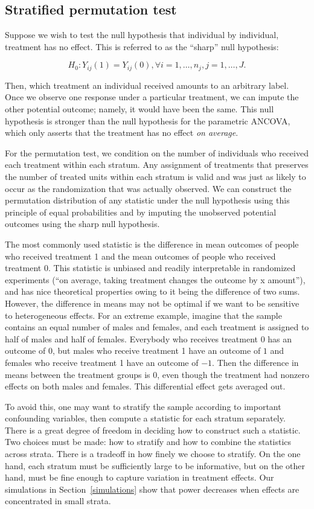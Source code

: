 \documentclass[12pt]{article}
\begin{document}
\subsection{Stratified permutation test}\label{subsec:strat_perm_test}
Suppose we wish to test the null hypothesis that individual by individual, treatment has no effect.
This is referred to as the ``sharp'' null hypothesis:

$$H_0: Y_{ij}(1) = Y_{ij}(0), \forall i = 1, \dots, n_j, j = 1,\dots, J.$$

Then, which treatment an individual received amounts to an arbitrary label.
Once we observe one response under a particular treatment, we can impute the other potential outcome; namely, it would have been the same.
This null hypothesis is stronger than the null hypothesis for the parametric ANCOVA, which only asserts that the treatment has no effect \textit{on average}.

For the permutation test, we condition on the number of individuals who received each treatment within each stratum.
Any assignment of treatments that preserves the number of treated units within each stratum is valid and was just as likely to occur as the randomization that was actually observed.
We can construct the permutation distribution of any statistic under the null hypothesis using this principle of equal probabilities and by imputing the unobserved potential outcomes using the sharp null hypothesis.

The most commonly used statistic is the difference in mean outcomes of people who received treatment 1 and the mean outcomes of people who received treatment 0.  
This statistic is unbiased and readily interpretable in randomized experiments (``on average, taking treatment changes the outcome by x amount''), and has nice theoretical properties owing to it being the difference of two sums.
However, the difference in means may not be optimal if we want to be sensitive to heterogeneous effects.  
For an extreme example, imagine that the sample contains an equal number of males and females, and each treatment is assigned to half of males and half of females.  
Everybody who receives treatment 0 has an outcome of 0, but males who receive treatment 1 have an outcome of $1$ and females who receive treatment 1 have an outcome of $-1$.  
Then the difference in means between the treatment groups is $0$, even though the treatment had nonzero effects on both males and females.  
This differential effect gets averaged out.

To avoid this, one may want to stratify the sample according to important confounding variables, then compute a statistic for each stratum separately. 
There is a great degree of freedom in deciding how to construct such a statistic.
Two choices must be made: how to stratify and how to combine the statistics across strata.
There is a tradeoff in how finely we choose to stratify.
On the one hand, each stratum must be sufficiently large to be informative,
 but on the other hand, must be fine enough to capture variation in treatment effects.
Our simulations in Section~\ref{simulations} show that power decreases when effects are concentrated in small strata.
\end{document}
